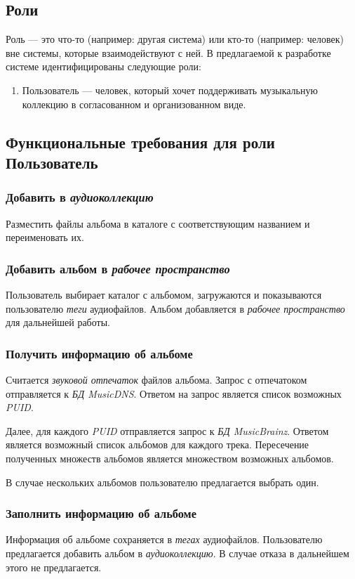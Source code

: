 \documentclass[pdftex,12pt,a4paper]{report}
\begin{document}
\subsection{Роли}
Роль --- это что-то (например: другая система) или кто-то (например: человек) вне системы, которые взаимодействуют с ней. В предлагаемой к разработке системе идентифицированы следующие роли:
	\begin{enumerate}
		\item Пользователь --- человек, который хочет поддерживать музыкальную коллекцию в согласованном и организованном виде.
	\end{enumerate}

\subsection{Функциональные требования для роли Пользователь}

\subsubsection{Добавить в {\it аудиоколлекцию}}
Разместить файлы альбома в каталоге с соответствующим названием и переименовать их.

\subsubsection{Добавить альбом в {\it рабочее пространство}}
Пользователь выбирает каталог с альбомом, загружаются и показываются пользователю {\it теги} аудиофайлов.
Альбом добавляется в {\it рабочее пространство} для дальнейшей работы.

\subsubsection{Получить информацию об альбоме}
Считается {\it звуковой отпечаток} файлов альбома. Запрос с отпечатоком отправляется к {\it БД MusicDNS}.
Ответом на запрос является список возможных {\it PUID}.

Далее, для каждого {\it PUID} отправляется запрос к {\it БД MusicBrainz}.
Ответом является возможный список альбомов для каждого трека.
Пересечение полученных множеств альбомов является множеством возможных альбомов.

В случае нескольких альбомов пользователю предлагается выбрать один.

\subsubsection{Заполнить информацию об альбоме}
Информация об альбоме сохраняется в {\it тегах} аудиофайлов.
Пользователю предлагается добавить альбом в {\it аудиоколлекцию}.
В случае отказа в дальнейшем этого не предлагается.
\end{document}
